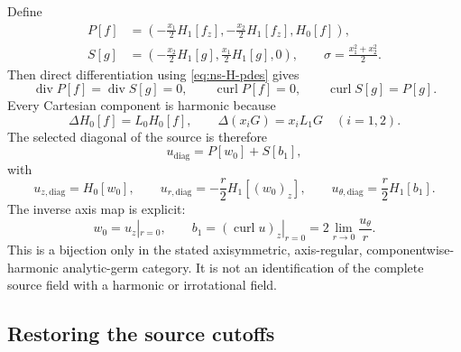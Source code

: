 Define
\begin{align}
 P[f]&=\left(-\frac{x_1}{2}H_1[f_z],-\frac{x_2}{2}H_1[f_z],H_0[f]\right),\\
 S[g]&=\left(-\frac{x_2}{2}H_1[g],\frac{x_1}{2}H_1[g],0\right),
 \qquad \sigma=\frac{x_1^2+x_2^2}{2}.
\end{align}
Then direct differentiation using \eqref{eq:ns-H-pdes} gives
\begin{equation}\label{eq:ns-selected-vector-identities}
 \operatorname{div}P[f]=\operatorname{div}S[g]=0,\quad\quad
 \operatorname{curl}P[f]=0,\quad\quad
 \operatorname{curl}S[g]=P[g].
\end{equation}
Every Cartesian component is harmonic because
\[
 \Delta H_0[f]=L_0H_0[f],\qquad
 \Delta(x_iG)=x_iL_1G\quad(i=1,2).
\]
The selected diagonal of the source is therefore
\begin{equation}\label{eq:ns-selected-diagonal}
 u_{\mathrm{diag}}=P[w_0]+S[b_1],
\end{equation}
with
\[
 u_{z,\mathrm{diag}}=H_0[w_0],\qquad
 u_{r,\mathrm{diag}}=-\frac r2H_1[(w_0)_z],\qquad
 u_{\theta,\mathrm{diag}}=\frac r2H_1[b_1].
\]
The inverse axis map is explicit:
\[
 w_0=u_z|_{r=0},\qquad b_1=(\operatorname{curl}u)_z|_{r=0}
 =2\lim_{r\to0}\frac{u_\theta}{r}.
\]
This is a bijection only in the stated axisymmetric, axis-regular,
componentwise-harmonic analytic-germ category.  It is not an identification
of the complete source field with a harmonic or irrotational field.

\subsection{Restoring the source cutoffs}

